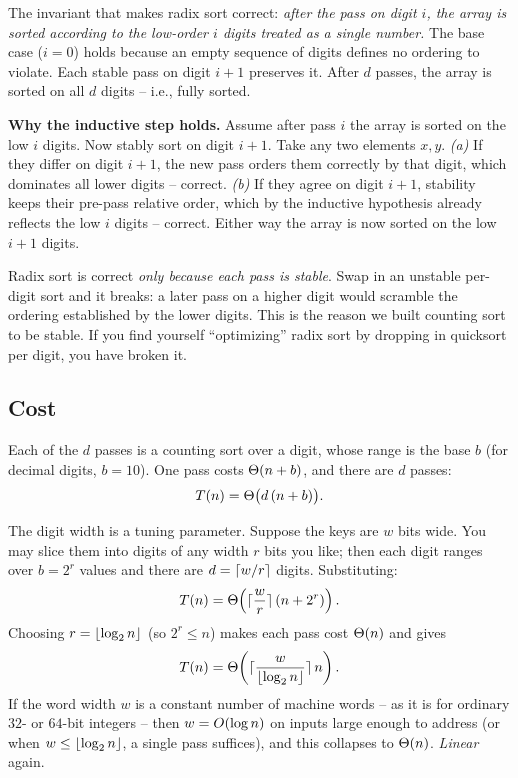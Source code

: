 \begin{focusbox}
The invariant that makes radix sort correct: \emph{after the pass on digit $i$,
the array is sorted according to the low-order $i$ digits treated as a single
number.} The base case ($i = 0$) holds because an empty sequence of digits defines
no ordering to violate. Each stable pass on digit $i+1$ preserves it. After $d$
passes, the array is sorted on all $d$ digits -- i.e., fully sorted.
\end{focusbox}

\begin{formalbox}
\textbf{Why the inductive step holds.} Assume after pass $i$ the array is sorted
on the low $i$ digits. Now stably sort on digit $i+1$. Take any two elements
$x, y$.
\emph{(a)} If they differ on digit $i+1$, the new pass orders them correctly by
that digit, which dominates all lower digits -- correct.
\emph{(b)} If they agree on digit $i+1$, stability keeps their pre-pass relative
order, which by the inductive hypothesis already reflects the low $i$ digits --
correct. Either way the array is now sorted on the low $i+1$ digits.
\end{formalbox}

\begin{trapbox}
Radix sort is correct \emph{only because each pass is stable}. Swap in an
unstable per-digit sort and it breaks: a later pass on a higher digit would
scramble the ordering established by the lower digits. This is the
reason we built counting sort to be stable. If you find yourself ``optimizing''
radix sort by dropping in quicksort per digit, you have broken it.
\end{trapbox}

\subsection{Cost}

Each of the $d$ passes is a counting sort over a digit, whose range is the base
$b$ (for decimal digits, $b = 10$). One pass costs $\Theta(n + b)$, and there are
$d$ passes:
\[
T(n) = \Theta\bigl(d\,(n + b)\bigr).
\]

The digit width is a tuning parameter. Suppose the keys are $w$ bits wide. You may
slice them into digits of any width $r$ bits you like; then each digit ranges
over $b = 2^r$ values and there are $d = \lceil w/r\rceil$ digits. Substituting:
\[
T(n) = \Theta\!\left(\lceil\frac{w}{r}\rceil\,(n + 2^r)\right).
\]
Choosing $r = \lfloor\log_2 n\rfloor$ (so $2^r \le n$) makes each pass cost $\Theta(n)$ and gives
\[
T(n) = \Theta\!\left(\lceil\frac{w}{\lfloor\log_2 n\rfloor}\rceil\,n\right).
\]
If the word width $w$ is a constant number of machine words -- as it is for
ordinary $32$- or $64$-bit integers -- then $w = O(\log n)$ on inputs large
enough to address (or when $w \le \lfloor\log_2 n\rfloor$, a single pass suffices), and this collapses to $\Theta(n)$. \emph{Linear} again.

